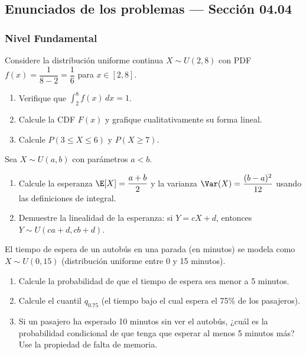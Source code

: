 
\subsection*{Enunciados de los problemas --- Sección 04.04}

\subsubsection*{Nivel Fundamental}

\begin{problema}
	\label{prob:4.4.1}
	Considere la distribución uniforme continua $X \sim U(2, 8)$ con PDF $f(x) = \dfrac{1}{8-2} = \dfrac{1}{6}$ para $x \in [2, 8]$.
	\begin{enumerate}
		\item Verifique que $\int_{2}^{8} f(x)\,dx = 1$.
		\item Calcule la CDF $F(x)$ y grafique cualitativamente su forma lineal.
		\item Calcule $P(3 \le X \le 6)$ y $P(X \ge 7)$.
	\end{enumerate}
\end{problema}

\begin{problema}
	\label{prob:4.4.2}
	Sea $X \sim U(a, b)$ con parámetros $a < b$.
	\begin{enumerate}
		\item Calcule la esperanza $\E[X] = \dfrac{a + b}{2}$ y la varianza $\Var(X) = \dfrac{(b-a)^{2}}{12}$ usando las definiciones de integral.
		\item Demuestre la linealidad de la esperanza: si $Y = cX + d$, entonces $Y \sim U(ca + d, cb + d)$.
	\end{enumerate}
\end{problema}

\begin{problema}
	\label{prob:4.4.3}
	El tiempo de espera de un autobús en una parada (en minutos) se modela como $X \sim U(0, 15)$ (distribución uniforme entre 0 y 15 minutos).
	\begin{enumerate}
		\item Calcule la probabilidad de que el tiempo de espera sea menor a 5 minutos.
		\item Calcule el cuantil $q_{0.75}$ (el tiempo bajo el cual espera el 75\% de los pasajeros).
		\item Si un pasajero ha esperado 10 minutos sin ver el autobús, ¿cuál es la probabilidad condicional de que tenga que esperar al menos 5 minutos más? Use la propiedad de falta de memoria.
	\end{enumerate}
\end{problema}

